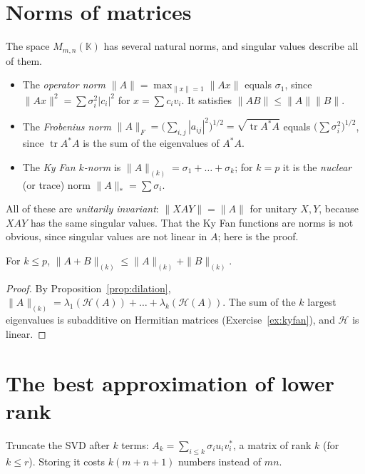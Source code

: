 \section{Norms of matrices}

The space $M_{m,n}(\mathbb K)$ has several natural norms, and singular values describe all of them.
\begin{itemize}
\item The \emph{operator norm} $\|A\|=\max_{\|x\|=1}\|Ax\|$ equals $\sigma_1$, since $\|Ax\|^2=\sum\sigma_i^2|c_i|^2$ for $x=
\sum c_iv_i$. It satisfies $\|AB\|\le\|A\|\|B\|$.
\item The \emph{Frobenius norm} $\|A\|_F=\bigl(\sum_{i,j}|a_{ij}|^2\bigr)^{1/2}=\sqrt{\operatorname{tr}A^*A}$ equals
$\bigl(\sum\sigma_i^2\bigr)^{1/2}$, since $\operatorname{tr}A^*A$ is the sum of the eigenvalues of $A^*A$.
\item The \emph{Ky Fan $k$-norm} is $\|A\|_{(k)}=\sigma_1+\dots+\sigma_k$; for $k=p$ it is the \emph{nuclear} (or trace) norm
$\|A\|_*=\sum\sigma_i$.
\end{itemize}
All of these are \emph{unitarily invariant}: $\|XAY\|=\|A\|$ for unitary $X,Y$, because $XAY$ has the same singular values.
That the Ky Fan functions are norms is not obvious, since singular values are not linear in $A$; here is the proof.

\begin{proposition}\label{prop:kyfannorm}
For $k\le p$, $\|A+B\|_{(k)}\le\|A\|_{(k)}+\|B\|_{(k)}$.
\end{proposition}
\begin{proof}
By Proposition~\ref{prop:dilation}, $\|A\|_{(k)}=\lambda_1(\mathcal H(A))+\dots+\lambda_k(\mathcal H(A))$. The sum of the $k$
largest eigenvalues is subadditive on Hermitian matrices (Exercise~\ref{ex:kyfan}), and $\mathcal H$ is linear.
\end{proof}

\section{The best approximation of lower rank}

Truncate the SVD after $k$ terms: $A_k=\sum_{i\le k}\sigma_iu_iv_i^*$, a matrix of rank $k$ (for $k\le r$). Storing it costs
$k(m+n+1)$ numbers instead of $mn$.

